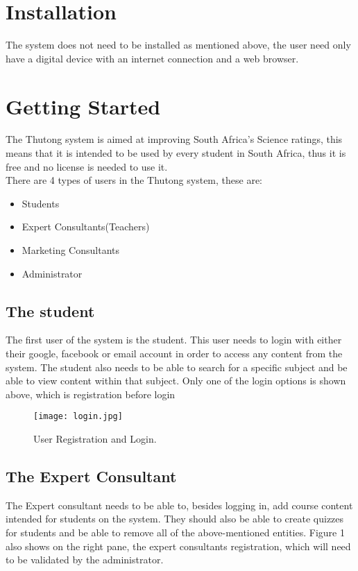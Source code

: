 \documentclass[12pt,a4paper]{article}
\begin{document}
		
	\section{Installation}
		The system does not need to be installed as mentioned above, the user need only have a digital device with an internet connection and a web browser.
		
	\section{Getting Started}
		The Thutong system is aimed at improving South Africa's Science ratings, this means that it is intended to be used by every student in South Africa, thus it is free and no license is needed to use it.\\
		There are 4 types of users in the Thutong system, these are:
		\begin{itemize}
			\item Students
			\item Expert Consultants(Teachers)
			\item Marketing Consultants
			\item Administrator
		\end{itemize} 
		  
		\subsection{The student}
		 The first user of the system is the student. This user needs to login with either their google, facebook or email account in order to access any content from the system. The student also needs to be able to search for a specific subject and be able to view content within that subject. Only one of the login options is shown above, which is registration before login\\
		 
		 
		 \begin{figure}
		 	\texttt{[image: login.jpg]}
		 	\caption{User Registration and Login.}
		 	\label{fig:user login}
		 \end{figure}
		 
		 \subsection{The Expert Consultant}
		 The Expert consultant needs to be able to, besides logging in, add course content intended for students on the system. They should also be able to create quizzes for students and be able to remove all of the above-mentioned entities. Figure 1 also shows on the right pane, the expert consultants registration, which will need to be validated by the administrator.
		
\end{document}
